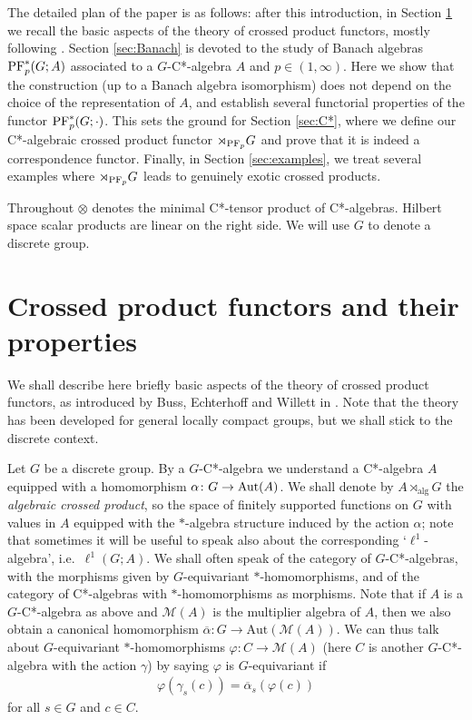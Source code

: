 \documentclass[12pt]{amsart}
\theoremstyle{definition}
\theoremstyle{remark}
\numberwithin{equation}{section}
\newcommand{\Aut}{\textup{Aut}}
\begin{document}
The detailed plan of the paper is as follows: after this introduction, in Section \ref{sec:cpf} we recall the basic aspects of the theory of crossed product functors, mostly following \cite{BEW}. Section \ref{sec:Banach} is devoted to the study of Banach algebras $\textup{PF}^*_p(G;A)$ associated to a $G$-C*-algebra $A$ and $p \in (1, \infty)$. Here we show that the construction (up to a Banach algebra isomorphism) does not depend on the choice of the representation of $A$, and establish several functorial properties of the functor $\textup{PF}^*_p(G;\cdot)$. This sets the ground for Section \ref{sec:C*}, where we define our C*-algebraic crossed product functor   $\rtimes_{\textup{PF}_p} G$ and prove that it is indeed a correspondence functor.
Finally, in Section \ref{sec:examples}, we treat several examples where $\rtimes_{\textup{PF}_p} G$ leads to genuinely exotic crossed products.






Throughout $\otimes$ denotes the minimal C*-tensor product of C*-algebras. Hilbert space scalar products are linear on the right side. We will use $G$ to denote a discrete group.



\section{Crossed product functors and their properties} \label{sec:cpf}

We shall describe here briefly basic aspects of the theory of crossed product functors, as introduced by Buss, Echterhoff and Willett in \cite{BEW}. Note that the theory has been developed for general locally compact groups, but we shall stick to the discrete context.

Let $G$ be a discrete group. By a $G$-C*-algebra we understand a C*-algebra $A$ equipped with a homomorphism $\alpha\colon G \to \Aut(A)$. We shall denote by $A\rtimes_{\mathrm{alg}}G$ the \emph{algebraic crossed product}, so the space of finitely supported functions on $G$ with values in $A$ equipped with the $*$-algebra structure induced by the action $\alpha$; note that sometimes it will be useful to speak also about the corresponding `$\ell^1$-algebra', i.e.\ $\ell^1(G;A)$.
We shall often speak of the category of $G$-C*-algebras, with the morphisms given by  $G$-equivariant $*$-homomorphisms, and of the category of C*-algebras with $*$-homomorphisms as morphisms.
Note that if $A$ is a $G$-C*-algebra as above and
$\mathcal{M}(A)$ is the multiplier algebra of $A$, then we also obtain a canonical homomorphism $\overline{\alpha}\colon G \to \mathrm{Aut}(\mathcal{M}(A))$. We can thus talk about $G$-equivariant $*$-homomorphisms $\varphi \colon C\to \mathcal{M}(A)$
(here $C$ is another $G$-C*-algebra with the action $\gamma$) by saying $\varphi$ is
$G$-equivariant if
\begin{align*}
	\varphi (\gamma_s(c)) = \overline{\alpha}_s (\varphi(c))
\end{align*}
for all $s\in G$ and $c\in C$.
\end{document}
